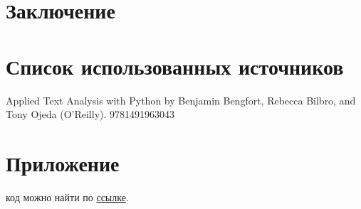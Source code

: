 \documentclass{article}
\newcommand\tab[1][1cm]{\hspace*{#1}}
\begin{document}
\section*{Заключение}
\newpage
{}
\section*{Список использованных источников}
\renewcommand{\refname}{}
\begin{thebibliography}{7}
 Applied Text Analysis with Python by Benjamin Bengfort, Rebecca Bilbro, and Tony Ojeda (O’Reilly). 978­1­491­96304­3
\end{thebibliography}
\newpage
{}
\section*{Приложение}
 код можно найти по \href{https://github.com/dokapoka/paper_text_classification}{ссылке}.





 
\end{document}
